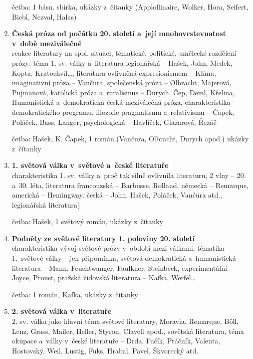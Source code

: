 \begin{enumerate}
četba: 1 básn. sbírka, ukázky z~čítanky (Applollinaire, Wolker, Hora, 
Seifert, Biebl, Nezval, Halas)     

\item \textbf{Česká próza od počátku 20. století a~její mnohovrstevnatost v~době meziválečné} \\
reakce literatury na spol. situaci, tématické, politické, umělecké
rozdělení prózy: téma 1. sv. války a~literatura legionářská -- Hašek, 
John, Medek, Kopta, Kratochvíl\dots, literatura ovlivněná expresionismem
-- Klíma, imaginativní próza -- Vančura, společenská próza -- Olbracht, 
Majerová, Pujmanová, katolická próza a~ruralismus -- Durych, Čep, Deml, 
Křelina, Humanistická a~demokratická česká meziválečná próza, 
charakteristika demokratického programu, filozofie pragmatismu
a~relativismu -- Čapek, Poláček, Bass, Langer, psychologická -- Havlíček, 
Glazarová, Řezáč

četba:  Hašek, K. Čapek, 1 román (Vančura, Olbracht, Durych apod.)
ukázky z~čítanky

\item \textbf{1. světová válka v~světové a~české literatuře} \\
charakteristika 1. sv. války a~proč tak silně ovlivnila literaturu, 2
vlny -- 20. a~30. léta, literatura francouzská -- Barbusse, Rolland, 
německá -- Remarque, americká -- Hemingway. česká -- John, Hašek, Poláček, 
Vančura atd., legionářská literatura) 

četba: Hašek, 1 světový román, ukázky z~čítanky 

\item \textbf{Podněty ze světové literatury 1. poloviny 20. století} \\
charakteristika vývoj světové prózy v~období mezi válkami, tématika 
1.~světové války -- jen připomínka, světová demokratická a~humanistická
literatura -- Mann, Feuchtwanger, Faulkner, Steinbeck, experimentální --
Joyce, Proust, pražská židovská literatura -- Kafka, Werfel\dots

četba: 1 román, Kafka, ukázky z~čítanky
      
\item \textbf{2. světová válka v~literatuře} \\ 
2. sv. válka jako hlavní téma světové literatury, Moravia, Remarque, 
B\" oll, Lenz, Grass, Mailer, Heller, Styron, Clavell apod., sovětská
literatura, téma okupace a~války v~české literatuře -- Drda, Fučík, 
Ptáčník, Valenta, Hostovský, Weil, Lustig, Fuks, Hrabal, Pavel, 
Škvorecký atd.


\end{enumerate}
